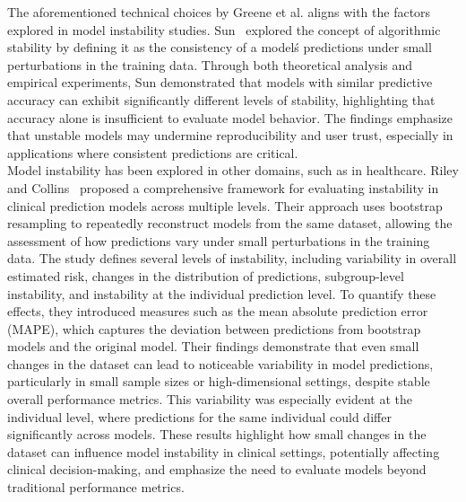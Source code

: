 \documentclass[12pt]{article}
\begin{document}
The aforementioned technical choices by Greene et al. aligns with the factors explored in model instability studies. Sun~\cite{sun2015stability} explored the concept of algorithmic stability by defining it as the consistency of a model\'s predictions under small perturbations in the training data. Through both theoretical analysis and empirical experiments, Sun demonstrated that models with similar predictive accuracy can exhibit significantly different levels of stability, highlighting that accuracy alone is insufficient to evaluate model behavior. The findings emphasize that unstable models may undermine reproducibility and user trust, especially in applications where consistent predictions are critical. \\

Model instability has been explored in other domains, such as in healthcare. Riley and Collins~\cite{riley2023stability} proposed a comprehensive framework for evaluating instability in clinical prediction models across multiple levels. Their approach uses bootstrap resampling to repeatedly reconstruct models from the same dataset, allowing the assessment of how predictions vary under small perturbations in the training data. The study defines several levels of instability, including variability in overall estimated risk, changes in the distribution of predictions, subgroup-level instability, and instability at the individual prediction level. To quantify these effects, they introduced measures such as the mean absolute prediction error (MAPE), which captures the deviation between predictions from bootstrap models and the original model. Their findings demonstrate that even small changes in the dataset can lead to noticeable variability in model predictions, particularly in small sample sizes or high-dimensional settings, despite stable overall performance metrics. This variability was especially evident at the individual level, where predictions for the same individual could differ significantly across models. These results highlight how small changes in the dataset can influence model instability in clinical settings, potentially affecting clinical decision-making, and emphasize the need to evaluate models beyond traditional performance metrics. \\
\end{document}
